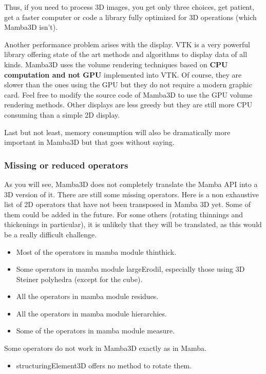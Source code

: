 \documentclass[a4paper,10pt,oneside]{article}
\begin{document}
Thus, if you need to process 3D images, you get only three choices, get patient, 
get a faster computer or code a library fully optimized for 3D operations 
(which Mamba3D isn't).

Another performance problem arises with the display. VTK is a very powerful
library offering state of the art methods and algorithms to display 
data of all kinds. Mamba3D uses the volume rendering techniques based on 
\textbf{CPU computation and not GPU} implemented into VTK. Of course, they
are slower than the ones using the GPU but they do not require a modern
graphic card. Feel free to modify the source code of Mamba3D to use the
GPU volume rendering methods. Other displays are less greedy but they
are still more CPU consuming than a simple 2D display.

Last but not least, memory consumption will also be dramatically more important
in Mamba3D but that goes without saying.

\subsubsection{Missing or reduced operators}
\label{cha:missing3D}

As you will see, Mamba3D does not completely translate the Mamba API into
a 3D version of it. There are still some missing operators. Here is a non
exhaustive list of 2D operators that have not been transposed in Mamba 3D yet.
Some of them could be added in the future. For some others (rotating thinnings
and thickenings in particular), it is unlikely that they will be translated, as
this would be a really difficult challenge.

\begin{itemize}
\item Most of the operators in mamba module thinthick.
\item Some operators in mamba module largeErodil, especially those using 3D Steiner polyhedra (except
for the cube).
\item All the operators in mamba module residues.
\item All the operators in mamba module hierarchies.
\item Some of the operators in mamba module measure.
\end{itemize}

Some operators do not work in Mamba3D exactly as in Mamba.

\begin{itemize}
\item structuringElement3D offers no method to rotate them.
\end{itemize}
\end{document}
